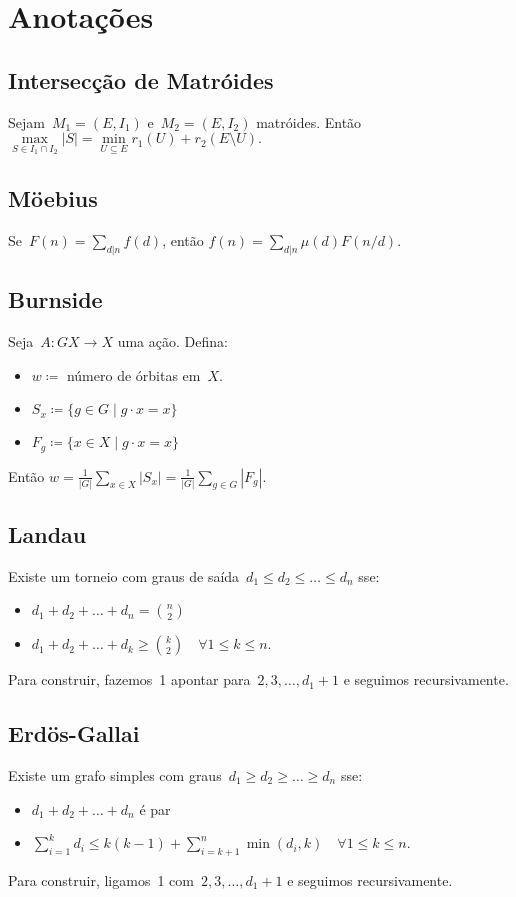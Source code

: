 \section{Anotações}
\subsection{Intersecção de Matróides}
Sejam~$M_1 = (E, I_1)$ e~$M_2 = (E, I_2)$ matróides. Então
$ \max\limits_{S \in I_1 \cap I_2}{|S|} = \min\limits_{U \subseteq E}{r_1(U) + r_2(E \setminus U)}. $

\subsection{Möebius}
Se~$F(n) = \sum\limits_{d | n}{f(d)}$, então
$f(n) = \sum\limits_{d | n}{\mu(d) F(n / d)}.$

\subsection{Burnside}
Seja~$A \colon GX \rightarrow X$ uma ação. Defina:
\begin{itemize}
\item $w \coloneqq $ número de órbitas em~$X$.
\item $S_x \coloneqq \{g \in G \mid g \cdot x = x \}$
\item $F_g \coloneqq \{x \in X \mid g \cdot x = x \} $
\end{itemize}

Então $ w = \frac{1}{|G|} \sum\limits_{x \in X}{|S_x|} = \frac{1}{|G|} \sum\limits_{g \in G}{|F_g|}. $

\subsection{Landau}
Existe um torneio com graus de saída~$d_1 \leq d_2 \leq \ldots \leq d_n$ sse:
\begin{itemize}
\item $d_1 + d_2 + \ldots + d_n = {n \choose 2}$
\item $d_1 + d_2 + \ldots + d_k \geq {k \choose 2} \quad \forall 1 \leq k \leq n.$
\end{itemize}
Para construir, fazemos~1 apontar para~$2, 3, \ldots, d_1 + 1$ e seguimos recursivamente.

\subsection{Erdös-Gallai}
Existe um grafo simples com graus~$d_1 \geq d_2 \geq \ldots \geq d_n$ sse:
\begin{itemize}
\item $d_1 + d_2 + \ldots + d_n$ é par
\item $\sum\limits_{i = 1}^k{d_i} \leq k(k-1) + \sum\limits_{i=k+1}^n{\min(d_i, k)} \quad \forall 1 \leq k \leq n$.
\end{itemize}
Para construir, ligamos~1 com~$2, 3, \ldots, d_1 + 1$ e seguimos recursivamente.

